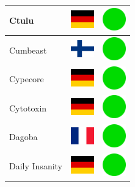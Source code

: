 \documentclass[12pt, a4paper, twoside]{report}
\begin{document}
\begin{center}
\begin{longtable}{|p{5cm}|p{2cm}|p{2cm}|}
 Ctulu                                                      & \includegraphics[width=1cm]{../4x3/de} &   \includegraphics[width=1cm]{../likes/y} \\ \hline
 Cumbeast                                                   & \includegraphics[width=1cm]{../4x3/fi} &   \includegraphics[width=1cm]{../likes/y} \\ \hline
 Cypecore                                                   & \includegraphics[width=1cm]{../4x3/de} &   \includegraphics[width=1cm]{../likes/y} \\ \hline
 Cytotoxin                                                  & \includegraphics[width=1cm]{../4x3/de} &   \includegraphics[width=1cm]{../likes/y} \\ \hline
 Dagoba                                                     & \includegraphics[width=1cm]{../4x3/fr} &   \includegraphics[width=1cm]{../likes/y} \\ \hline
 Daily Insanity                                             & \includegraphics[width=1cm]{../4x3/de} &   \includegraphics[width=1cm]{../likes/y} \\ \hline

\end{longtable}
\end{center}
\end{document}
